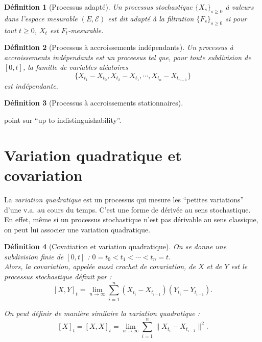 \documentclass[openany]{book}
\newcommand{\carE}{\mathscr{E}}
\theoremstyle{thmfont}
\theoremstyle{deffont}
\newtheorem{definition}[definition]{Définition}
\theoremstyle{thmfont}
\theoremstyle{deffont}
\begin{document}

\begin{definition}[Processus adapté] Un processus stochastique $\{X_s\}_{s\ge0}$ à valeurs dans l'espace mesurable $(E, \carE)$ est dit \textit{adapté} à la filtration $\{F_s\}_{s\geq0}$ si pour tout $t\geq0$, $X_t$ est $F_t$-mesurable.
\label{def:pr_adapte}
\end{definition}

\begin{definition}[Processus à accroissements indépendants]
  \label{def:pr_accr_indep} Un processus à \textit{accroissements indépendants} est un proceesus tel que, pour toute subdivision de $[0,t]$, la famille de variables aléatoires
    $$\{X_{t_1} - X_{t_0}, X_{t_2} - X_{t_1}, \cdots ,X_{t_n} - X_{t_{n-1}}\}$$
    est indépendante.
\end{definition}

{\color{red}
  \begin{definition}[Processus à accroissements stationnaires]
        \label{def:pr_accr_sta}
  \end{definition}
    
  point sur ``up to indistinguishability''.
}

\section{Variation quadratique et covariation}

La \textit{variation quadratique} est un processus qui mesure les ``petites variations'' d'une v.a. au cours du temps. C'est une forme de dérivée au sens stochastique. En effet, même si un processus stochastique n'est pas dérivable au sens classique, on peut lui associer une variation quadratique. 

\begin{definition}[Covatiation et variation quadratique] On se donne une subdivision finie de $[0,t]$ :  $0 = t_0 < t_1 < \cdots < t_n = t$.\\
  Alors, la \textit{covariation}, appelée aussi \textit{crochet de covariation}, de $X$ et de $Y$ est le processus stochastique définit par :
  $$[X,Y]_t = \lim_{n\to \infty} \sum_{i = 1}^n(X_{t_i} - X_{t_{i-1}})(Y_{t_i} - Y_{t_{i-1}}).$$

 On peut définir de manière similaire la \textit{variation quadratique} :
 $$[X]_t = [X,X]_t = \lim_{n\to \infty} \sum_{i = 1}^n\|X_{t_i} - X_{t_{i-1}}\|^2.$$
\label{def:crochet}
\end{definition}
\end{document}
